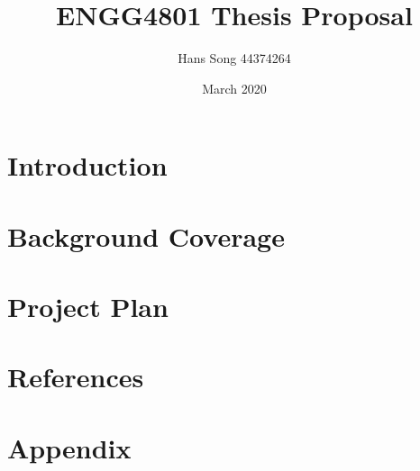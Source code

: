 \documentclass{article}
\title{ENGG4801 Thesis Proposal}
\author{Hans Song 44374264}
\date{March 2020}
\begin{document}
\maketitle

\section{Introduction}

\section{Background Coverage}

\section{Project Plan}

\section{References}

\section{Appendix}
\end{document}
